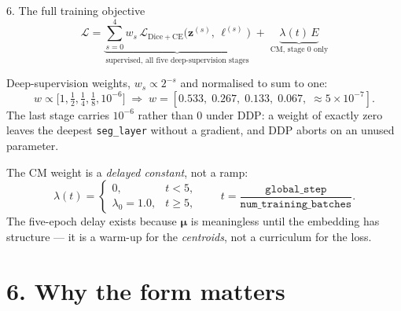 \documentclass[10pt,aspectratio=169]{beamer}
\newcommand{\muv}{\boldsymbol{\mu}}
\newcommand{\zv}{\mathbf{z}}
\begin{document}
\begin{frame}{6. The full training objective}
\small
\[
  \mathcal{L}
  = \underbrace{\sum_{s=0}^{4} w_s\,
      \mathcal{L}_{\mathrm{Dice{+}CE}}\!\bigl(\zv^{(s)},\,\ell^{(s)}\bigr)}
    _{\text{supervised, all five deep-supervision stages}}
  \;+\;
  \underbrace{\lambda(t)\,E}_{\text{CM, stage 0 only}}
\]

\vspace{0.6em}
Deep-supervision weights, $w_s \propto 2^{-s}$ and normalised to sum to one:
\[
  w \propto \bigl[1,\tfrac12,\tfrac14,\tfrac18,10^{-6}\bigr]
  \;\Longrightarrow\;
  w = [0.533,\;0.267,\;0.133,\;0.067,\;{\approx}5\!\times\!10^{-7}].
\]
The last stage carries $10^{-6}$ rather than $0$ under DDP: a weight of exactly zero leaves the deepest
\texttt{seg\_layer} without a gradient, and DDP aborts on an unused parameter.

\vspace{0.8em}
The CM weight is a \emph{delayed constant}, not a ramp:
\[
  \lambda(t) =
  \begin{cases}
    0, & t < 5,\\
    \lambda_0 = 1.0, & t \ge 5,
  \end{cases}
  \qquad
  t = \frac{\texttt{global\_step}}{\texttt{num\_training\_batches}} .
\]
The five-epoch delay exists because $\muv$ is meaningless until the embedding has structure --- it is a
warm-up for the \emph{centroids}, not a curriculum for the loss.
\end{frame}

\section{6. Why the form matters}
\end{document}
